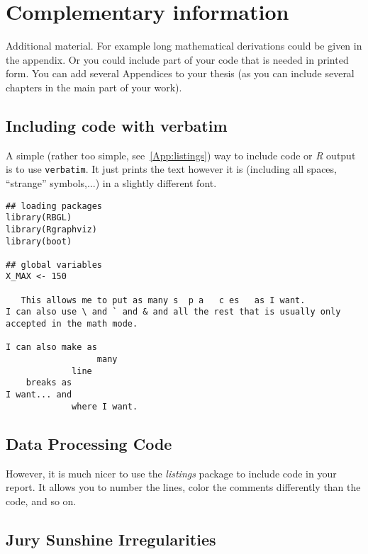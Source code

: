 \chapter{Complementary information}
\label{app:complement}

Additional material. For example long mathematical derivations could be
given in the appendix. Or you could include part of your code that is
needed in printed form. You can add several Appendices to your thesis (as
you can include several chapters in the main part of your work).

\section{Including \Rp code with verbatim}
A simple (rather too simple, see~\ref{App:listings}) way to include code or
{\it R} output is to use 
\texttt{verbatim}. It just prints the text however it is (including all
spaces, ``strange'' symbols,...) in a slightly different font.
\begin{verbatim}
## loading packages
library(RBGL)
library(Rgraphviz)
library(boot)

## global variables
X_MAX <- 150

   This allows me to put as many s  p a   c es   as I want.
I can also use \ and ` and & and all the rest that is usually only 
accepted in the math mode.

I can also make as 
                  many 
             line 
    breaks as 
I want... and
             where I want. 
\end{verbatim}

\section{Data Processing Code}\label{app:proccode}
However, it is much nicer to use the \emph{listings} package to include \Rp
code in your report. It allows you to number the lines, color the comments
differently than the code, and so on.




\section{Jury Sunshine Irregularities} \label{app:irregs}

